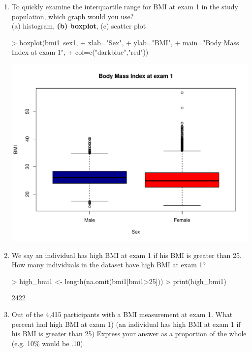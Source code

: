 \documentclass{article}
\begin{document}
\begin{enumerate}
  \item To quickly examine the interquartile range for BMI at exam 1 in the study population, which graph would you use?\\
(a) histogram, \textbf{(b) boxplot}, (c) scatter plot

\begin{Schunk}
\begin{Sinput}
> boxplot(bmi1~sex1, 
+         xlab="Sex", 
+         ylab="BMI", 
+         main="Body Mass Index at exam 1", 
+         col=c("darkblue","red"))
\end{Sinput}
\end{Schunk}
\includegraphics{Week1-boxplot}

\item We say an individual has high BMI at exam 1 if his BMI is greater than 25.  How many individuals in the dataset have high BMI at exam 1?  

\begin{Schunk}
\begin{Sinput}
> high_bmi1 <- length(na.omit(bmi1[bmi1>25]))
> print(high_bmi1)
\end{Sinput}
\begin{Soutput}
[1] 2422
\end{Soutput}
\end{Schunk}
\pagebreak
\item Out of the 4,415 participants with a BMI measurement at exam 1. What percent had high BMI at exam 1) (an individual has high BMI at exam 1 if his BMI is greater than 25) Express your answer as a proportion of the whole (e.g. 10\% would be .10).


\end{enumerate}
\end{document}
